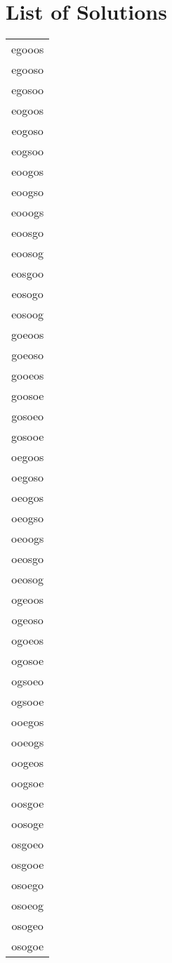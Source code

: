 \documentclass{article}
\begin{document}
\section{List of Solutions}
\begin{center}
\def\arraystretch{1}
{\setlength{\tabcolsep}{2em}
\begin{tabular}{| c |} 
 \hline
egooos\\ 
egooso\\ 
egosoo\\ 
eogoos\\ 
eogoso\\ 
eogsoo\\ 
eoogos\\ 
eoogso\\ 
eooogs\\ 
eoosgo\\ 
eoosog\\ 
eosgoo\\ 
eosogo\\ 
eosoog\\ 
goeoos\\ 
goeoso\\ 
gooeos\\ 
goosoe\\ 
gosoeo\\ 
gosooe\\ 
oegoos\\ 
oegoso\\ 
oeogos\\ 
oeogso\\ 
oeoogs\\ 
oeosgo\\ 
oeosog\\ 
ogeoos\\ 
ogeoso\\ 
ogoeos\\ 
ogosoe\\ 
ogsoeo\\ 
ogsooe\\ 
ooegos\\ 
ooeogs\\ 
oogeos\\ 
oogsoe\\ 
oosgoe\\ 
oosoge\\ 
osgoeo\\ 
osgooe\\ 
osoego\\ 
osoeog\\ 
osogeo\\ 
osogoe\\ 

\end{tabular}}
\end{center}
\end{document}
